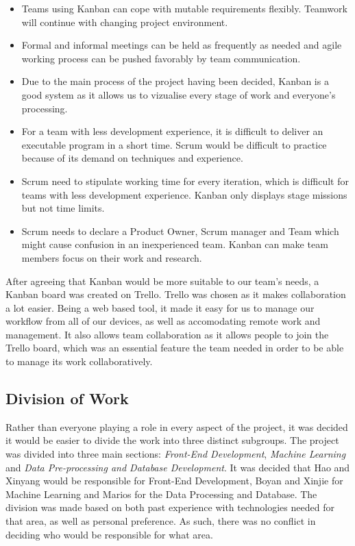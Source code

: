\documentclass[titlepage]{article}
\begin{document}
\begin{itemize}
\item Teams using Kanban can cope with mutable requirements flexibly. Teamwork will continue with changing project environment.
\item Formal and informal meetings can be held as frequently as needed and agile working process can be pushed favorably by team communication.
\item Due to the main process of the project having been decided, Kanban is a good system as it allows us to vizualise every stage of work and everyone’s processing.
\item For a team with less development experience, it is difficult to deliver an executable program in a short time. Scrum would be difficult to practice because of its demand on techniques and experience.
\item Scrum need to stipulate working time for every iteration, which is difficult for teams with less development experience. Kanban only displays stage missions but not time limits.
\item Scrum needs to declare a Product Owner, Scrum manager and Team which might cause confusion in an inexperienced team. Kanban can make team members focus on their work and research.
\end{itemize}

After agreeing that Kanban would be more suitable to our team's needs, a Kanban board was created on Trello. Trello was chosen as it makes collaboration a lot easier. Being a web based tool, it made it easy for us to manage our workflow from all of our devices, as well as accomodating remote work and management. It also allows team collaboration as it allows people to join the Trello board, which was an essential feature the team needed in order to be able to manage its work collaboratively.

\subsection{Division of Work}
Rather than everyone playing a role in every aspect of the project, it was decided it would be easier to divide the work into three distinct subgroups. The project was divided into three main sections: \textit{Front-End Development}, \textit{Machine Learning} and \textit{Data Pre-processing and Database Development}. It was decided that Hao and Xinyang would be responsible for Front-End Development, Boyan and Xinjie for Machine Learning and Marios for the Data Processing and Database. The division was made based on both past experience with technologies needed for that area, as well as personal preference. As such, there was no conflict in deciding who would be responsible for what area.
\end{document}
